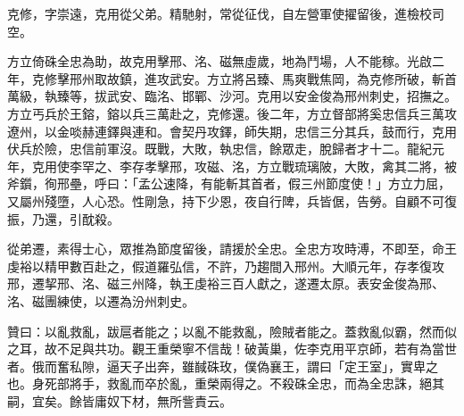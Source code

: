 \begin{pinyinscope}
 克修，字崇遠，克用從父弟。精馳射，常從征伐，自左營軍使擢留後，進檢校司空。



 方立倚硃全忠為助，故克用擊邢、洺、磁無虛歲，地為鬥場，人不能稼。光啟二年，克修擊邢州取故鎮，進攻武安。方立將呂臻、馬爽戰焦岡，為克修所破，斬首萬級，執臻等，拔武安、臨洺、邯鄲、沙河。克用以安金俊為邢州刺史，招撫之。方立丐兵於王鎔，鎔以兵三萬赴之，克修還。後二年，方立督部將奚忠信兵三萬攻遼州，以金啖赫連鐸與連和。會契丹攻鐸，師失期，忠信三分其兵，鼓而行，克用伏兵於險，忠信前軍沒。既戰，大敗，執忠信，餘眾走，脫歸者才十二。龍紀元年，克用使李罕之、李存孝擊邢，攻磁、洺，方立戰琉璃陂，大敗，禽其二將，被斧鑕，徇邢壘，呼曰：「孟公速降，有能斬其首者，假三州節度使！」方立力屈，又屬州殘墮，人心恐。性剛急，持下少恩，夜自行陴，兵皆倨，告勞。自顧不可復振，乃還，引酖殺。



 從弟遷，素得士心，眾推為節度留後，請援於全忠。全忠方攻時溥，不即至，命王虔裕以精甲數百赴之，假道羅弘信，不許，乃趨間入邢州。大順元年，存孝復攻邢，遷挈邢、洺、磁三州降，執王虔裕三百人獻之，遂遷太原。表安金俊為邢、洺、磁團練使，以遷為汾州刺史。



 贊曰：以亂救亂，跋扈者能之；以亂不能救亂，險賊者能之。蓋救亂似霸，然而似之耳，故不足與共功。觀王重榮寧不信哉！破黃巢，佐李克用平京師，若有為當世者。俄而奮私隙，逼天子出奔，雖馘硃玫，僕偽襄王，謂曰「定王室」，實卑之也。身死部將手，救亂而卒於亂，重榮兩得之。不殺硃全忠，而為全忠誅，絕其嗣，宜矣。餘皆庸奴下材，無所訾責云。



\end{pinyinscope}